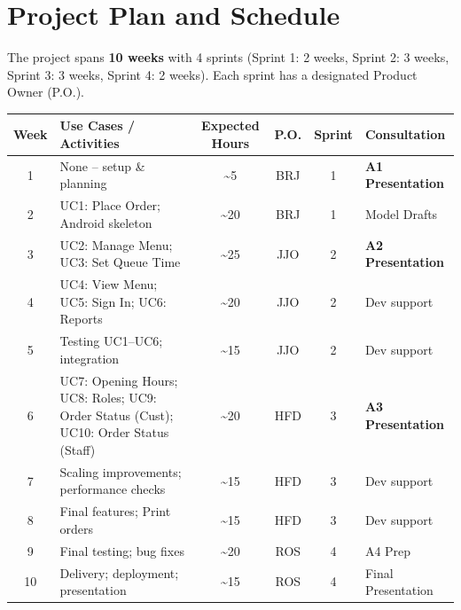 \documentclass{article}
\begin{document}
\section{Project Plan and Schedule}

The project spans \textbf{10 weeks} with 4 sprints (Sprint 1: 2 weeks, Sprint 2: 3 weeks, Sprint 3: 3 weeks, Sprint 4: 2 weeks).
Each sprint has a designated Product Owner (P.O.).

\begin{center}
\renewcommand{\arraystretch}{1.6} %
\large %
\begin{adjustbox}{max width=\textwidth}
\begin{tabular}{|c|>{\raggedright\arraybackslash}p{5cm}|c|c|c|>{\raggedright\arraybackslash}p{4cm}|}
\hline
\textbf{Week} & \textbf{Use Cases / Activities} & \textbf{Expected Hours} & \textbf{P.O.} & \textbf{Sprint} & \textbf{Consultation} \\ \hline
1  & None -- setup \& planning                    & \textasciitilde5  & BRJ & 1 & \textbf{A1 Presentation} \\ \hline
2  & UC1: Place Order; Android skeleton           & \textasciitilde20 & BRJ & 1 & Model Drafts \\ \hline
3  & UC2: Manage Menu; UC3: Set Queue Time        & \textasciitilde25 & JJO & 2 & \textbf{A2 Presentation} \\ \hline
4  & UC4: View Menu; UC5: Sign In; UC6: Reports   & \textasciitilde20 & JJO & 2 & Dev support \\ \hline
5  & Testing UC1--UC6; integration                & \textasciitilde15 & JJO & 2 & Dev support \\ \hline
6  & UC7: Opening Hours; UC8: Roles; UC9: Order Status (Cust); UC10: Order Status (Staff) & \textasciitilde20 & HFD & 3 & \textbf{A3 Presentation} \\ \hline
7  & Scaling improvements; performance checks     & \textasciitilde15 & HFD & 3 & Dev support \\ \hline
8  & Final features; Print orders                & \textasciitilde15 & HFD & 3 & Dev support \\ \hline
9  & Final testing; bug fixes                     & \textasciitilde20 & ROS & 4 & A4 Prep \\ \hline
10 & Delivery; deployment; presentation           & \textasciitilde15 & ROS & 4 & Final Presentation \\ \hline
\end{tabular}
\end{adjustbox}
\end{center}
\end{document}
